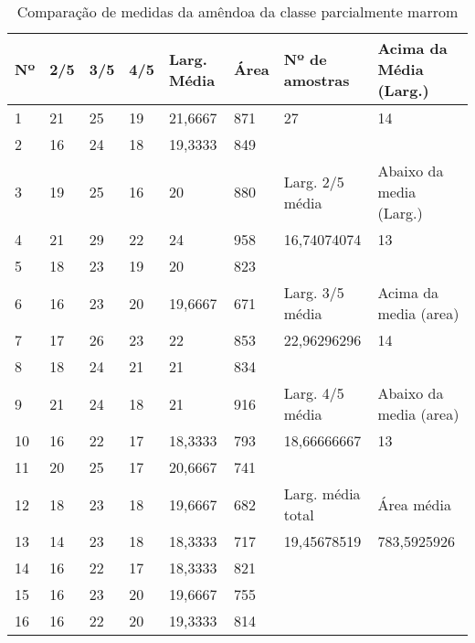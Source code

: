 \begin{anexosenv}
\begin{table}[hbtp!]
\centering
\caption{Comparação de medidas da amêndoa da classe parcialmente marrom}
\label{tab:medidas_classe_parc_marrom}
\begin{tabular}{|l|l|l|l|l|l|l|l|}
\hline
Nº & 2/5 & 3/5 & 4/5 & Larg. Média & Área & Nº de amostras & Acima da Média (Larg.) \\ \hline
1  & 21  & 25  & 19  & 21,6667     & 871  & 27               & 14                     \\
2  & 16  & 24  & 18  & 19,3333     & 849  &                  &                        \\\cline{7-8}
3  & 19  & 25  & 16  & 20          & 880  & \multicolumn{1}{l|}{Larg. 2/5 média}   & \multicolumn{1}{l|}{Abaixo da media (Larg.)} \\\cline{7-8}
4  & 21  & 29  & 22  & 24          & 958  & 16,74074074      & 13                     \\
5  & 18  & 23  & 19  & 20          & 823  &                  &                        \\\cline{7-8}
6  & 16  & 23  & 20  & 19,6667     & 671  & \multicolumn{1}{l|}{Larg. 3/5 média}  & \multicolumn{1}{l|}{Acima da media (area)}  \\\cline{7-8}
7  & 17  & 26  & 23  & 22          & 853  & 22,96296296      & 14                     \\
8  & 18  & 24  & 21  & 21          & 834  &                  &                        \\\cline{7-8}
9  & 21  & 24  & 18  & 21          & 916  & \multicolumn{1}{l|}{Larg. 4/5 média}   & \multicolumn{1}{l|}{Abaixo da media (area)} \\\cline{7-8}
10 & 16  & 22  & 17  & 18,3333     & 793  & 18,66666667      & 13                     \\
11 & 20  & 25  & 17  & 20,6667     & 741  &                  &                        \\\cline{7-8}
12 & 18  & 23  & 18  & 19,6667     & 682  & Larg. média total & \multicolumn{1}{l|}{Área média}             \\\cline{7-8}
13 & 14  & 23  & 18  & 18,3333     & 717  & 19,45678519      & 783,5925926            \\
14 & 16  & 22  & 17  & 18,3333     & 821  &                  &                        \\
15 & 16  & 23  & 20  & 19,6667     & 755  &                  &                        \\
16 & 16  & 22  & 20  & 19,3333     & 814  &                  &                        \\

\end{tabular}
\end{table}
\end{anexosenv}
